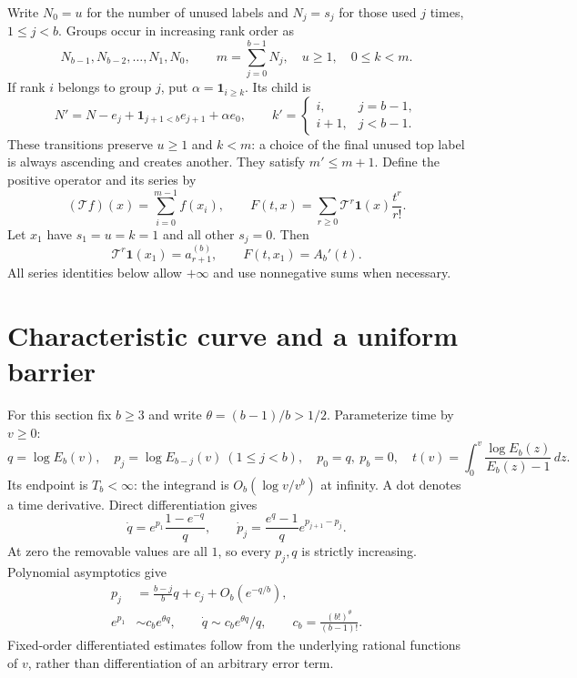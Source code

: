 \documentclass[11pt,letterpaper]{article}
\theoremstyle{remark}\newtheorem{remark}[theorem]{Remark}
\newcommand{\TT}{\mathcal T}
\newcommand{\one}{\mathbf 1}
\begin{document}
Write $N_0=u$ for the number of unused labels and $N_j=s_j$ for those used $j$ times, $1\le j<b$. Groups occur in increasing rank order as
\[
 N_{b-1},N_{b-2},\ldots,N_1,N_0,\qquad
 m=\sum_{j=0}^{b-1}N_j,\quad u\ge1,\quad0\le k<m.
\]
If rank $i$ belongs to group $j$, put $\alpha=\one_{i\ge k}$. Its child is
\begin{equation}\label{amc:eq:transition}
 N'=N-e_j+\one_{j+1<b}e_{j+1}+\alpha e_0,
 \qquad
 k'=\begin{cases}i,&j=b-1,\\i+1,&j<b-1.\end{cases}
\end{equation}
These transitions preserve $u\ge1$ and $k<m$: a choice of the final unused top label is always ascending and creates another. They satisfy $m'\le m+1$.
Define the positive operator and its series by
\begin{equation}\label{amc:eq:operator}
 (\TT f)(x)=\sum_{i=0}^{m-1}f(x_i),\qquad
 F(t,x)=\sum_{r\ge0}\TT^r\one(x)\frac{t^r}{r!}.
\end{equation}
Let $x_1$ have $s_1=u=k=1$ and all other $s_j=0$. Then
\[
 \TT^r\one(x_1)=a_{r+1}^{(b)},\qquad F(t,x_1)=A_b'(t).
\]
All series identities below allow $+\infty$ and use nonnegative sums when necessary.

\section{Characteristic curve and a uniform barrier}\label{amc:sec:barrier}
For this section fix $b\ge3$ and write $\theta=(b-1)/b>1/2$. Parameterize time by $v\ge0$:
\begin{equation}\label{amc:eq:characteristic}
 q=\log E_b(v),\quad p_j=\log E_{b-j}(v)\ (1\le j<b),\quad
 p_0=q,\ p_b=0,\quad
 t(v)=\int_0^v\frac{\log E_b(z)}{E_b(z)-1}\,dz.
\end{equation}
Its endpoint is $T_b<\infty$: the integrand is $O_b(\log v/v^b)$ at infinity. A dot denotes a time derivative. Direct differentiation gives
\begin{equation}\label{amc:eq:ODE}
 \dot q=e^{p_1}\frac{1-e^{-q}}q,
 \qquad \dot p_j=\frac{e^q-1}{q}e^{p_{j+1}-p_j}.
\end{equation}
At zero the removable values are all $1$, so every $p_j,q$ is strictly increasing. Polynomial asymptotics give
\begin{align}
 p_j&=\frac{b-j}{b}q+c_j+O_b(e^{-q/b}),\label{amc:eq:poly}\\
 e^{p_1}&\sim c_b e^{\theta q},\qquad
 \dot q\sim c_b e^{\theta q}/q,\qquad
 c_b=\frac{(b!)^{\theta}}{(b-1)!}.
\end{align}
Fixed-order differentiated estimates follow from the underlying rational functions of $v$, rather than differentiation of an arbitrary error term.
\end{document}

